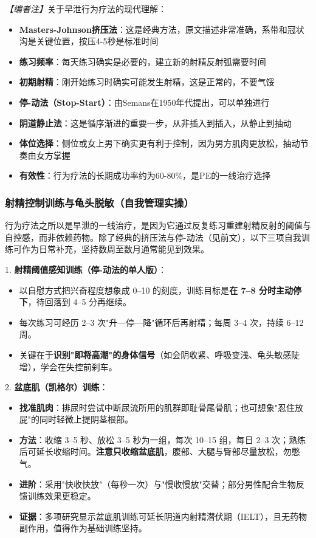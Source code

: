 \noindent\textit{【编者注】}关于早泄行为疗法的现代理解：
\begin{itemize}
	\item \textbf{Masters-Johnson挤压法}：这是经典方法，原文描述非常准确，系带和冠状沟是关键位置，按压4-5秒是标准时间
	\item \textbf{练习频率}：每天练习确实是必要的，建立新的射精反射弧需要时间
	\item \textbf{初期射精}：刚开始练习时确实可能发生射精，这是正常的，不要气馁
	\item \textbf{停-动法（Stop-Start）}：由Semans在1950年代提出，可以单独进行
	\item \textbf{阴道静止法}：这是循序渐进的重要一步，从非插入到插入，从静止到抽动
	\item \textbf{体位选择}：侧位或女上男下确实更有利于控制，因为男方肌肉更放松，抽动节奏由女方掌握
	\item \textbf{有效性}：行为疗法的长期成功率约为60-80\%，是PE的一线治疗选择
\end{itemize}

\subsubsection{射精控制训练与龟头脱敏（自我管理实操）}

行为疗法之所以是早泄的一线治疗，是因为它通过反复练习重建射精反射的阈值与自控感，而非依赖药物。除了经典的挤压法与停-动法（见前文），以下三项自我训练可作为日常补充，坚持数周至数月通常能见到效果。

1. \textbf{射精阈值感知训练（停-动法的单人版）}：
  \begin{itemize}
  \item 以自慰方式把兴奋程度想象成 0--10 的刻度，训练目标是\textbf{在 7--8 分时主动停下}，待回落到 4--5 分再继续。
  \item 每次练习可经历 2--3 次"升—停—降"循环后再射精；每周 3--4 次，持续 6--12 周。
  \item 关键在于\textbf{识别"即将高潮"的身体信号}（如会阴收紧、呼吸变浅、龟头敏感陡增），学会在失控前刹车。
  \end{itemize}

2. \textbf{盆底肌（凯格尔）训练}：
  \begin{itemize}
  \item \textbf{找准肌肉}：排尿时尝试中断尿流所用的肌群即耻骨尾骨肌；也可想象"忍住放屁"的同时轻微上提阴茎根部。
  \item \textbf{方法}：收缩 3--5 秒、放松 3--5 秒为一组，每次 10--15 组，每日 2--3 次；熟练后可延长收缩时间。\textbf{注意只收缩盆底肌}，腹部、大腿与臀部尽量放松，勿憋气。
  \item \textbf{进阶}：采用"快收快放"（每秒一次）与"慢收慢放"交替；部分男性配合生物反馈训练效果更稳定。
  \item \textbf{证据}：多项研究显示盆底肌训练可延长阴道内射精潜伏期（IELT），且无药物副作用，值得作为基础训练坚持。
  \end{itemize}

